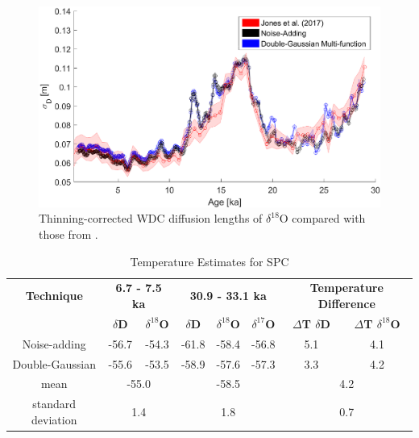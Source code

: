 \documentclass[draft, jgrga]{AGUTeX}
\begin{document}
\begin{figure}
	\includegraphics[width=.9\linewidth]{WAIS_diffusion_lengths_thinning_corr.eps}
	\caption{Thinning-corrected WDC diffusion lengths of $\delta^{18}$O compared with those from \cite{Jones2017a}.} \label{WAIS_diffusion_lengths_thinning_corr}
\end{figure}

\begin{table}
\caption{Temperature Estimates for SPC}\label{SP_deltaT}
\begin{tabular}{c|c c|c c c|c c}
\textbf{Technique} & \multicolumn{2}{|c|}{\textbf{6.7 - 7.5 ka}} & \multicolumn{3}{|c|}{\textbf{30.9 - 33.1 ka}} & \multicolumn{2}{|c}{\textbf{Temperature Difference}}\\
 & \textbf{$\delta$D} & \textbf{$\delta^{18}$O} & \textbf{$\delta$D} & \textbf{$\delta^{18}$O} & \textbf{$\delta^{17}$O} & \textbf{$\Delta$T $\delta$D} & \textbf{$\Delta$T $\delta^{18}$O}\\
\hline
Noise-adding & -56.7 & -54.3 & -61.8 & -58.4 & -56.8 & 5.1 & 4.1 \\
Double-Gaussian & -55.6 & -53.5 & -58.9 & -57.6 & -57.3 & 3.3 & 4.2 \\
\hline
mean & \multicolumn{2}{|c|}{-55.0} & \multicolumn{3}{|c|}{-58.5} & \multicolumn{2}{|c}{4.2} \\
standard deviation & \multicolumn{2}{|c|}{1.4} & \multicolumn{3}{|c|}{1.8} & \multicolumn{2}{|c}{0.7} \\
\end{tabular}
\end{table}
\end{document}

